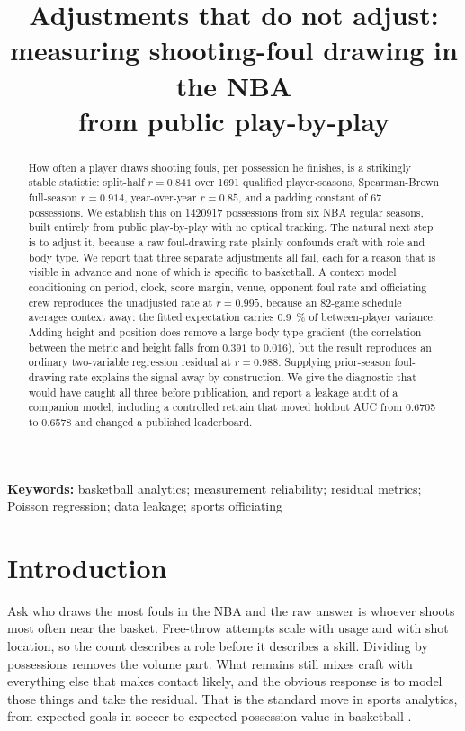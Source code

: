 \documentclass[11pt,letterpaper]{article}
\title{\bfseries Adjustments that do not adjust:\\
measuring shooting-foul drawing in the NBA\\
from public play-by-play}
\author{}
\date{}
\begin{document}
\maketitle

\begin{abstract}
\noindent
How often a player draws shooting fouls, per possession he finishes, is a
strikingly stable statistic: split-half $r = 0.841$ over \num{1691} qualified
player-seasons, Spearman-Brown full-season $r = 0.914$, year-over-year
$r = 0.85$, and a padding constant of 67 possessions. We establish this on
\num{1420917} possessions from six NBA regular seasons, built entirely from
public play-by-play with no optical tracking. The natural next step is to adjust it, because a raw foul-drawing rate plainly
confounds craft with role and body type. We report that three separate
adjustments all fail, each for a reason that is visible in advance and none of
which is specific to basketball. A context model conditioning on period, clock,
score margin, venue, opponent foul rate and officiating crew reproduces the
unadjusted rate at $r = 0.995$, because an 82-game schedule averages context
away: the fitted expectation carries \SI{0.9}{\percent} of between-player
variance. Adding height and position does remove a large body-type gradient
(the correlation between the metric and height falls from $0.391$ to $0.016$),
but the result reproduces an ordinary two-variable regression residual at
$r = 0.988$. Supplying prior-season foul-drawing rate explains the signal away
by construction. We give the diagnostic that would have caught all three before
publication, and report a leakage audit of a companion model, including a
controlled retrain that moved holdout AUC from 0.6705 to 0.6578 and changed a
published leaderboard.

\end{abstract}

\noindent\textbf{Keywords:} basketball analytics; measurement reliability;
residual metrics; Poisson regression; data leakage; sports officiating

\section{Introduction}

Ask who draws the most fouls in the NBA and the raw answer is whoever shoots
most often near the basket. Free-throw attempts scale with usage and with shot
location, so the count describes a role before it describes a skill. Dividing by
possessions removes the volume part. What remains still mixes craft with
everything else that makes contact likely, and the obvious response is to model
those things and take the residual. That is the standard move in sports
analytics, from expected goals in soccer \citep{rathke2017examination,
decroos2019actions} to expected possession value in basketball
\citep{cervone2016multiresolution}.
\end{document}
